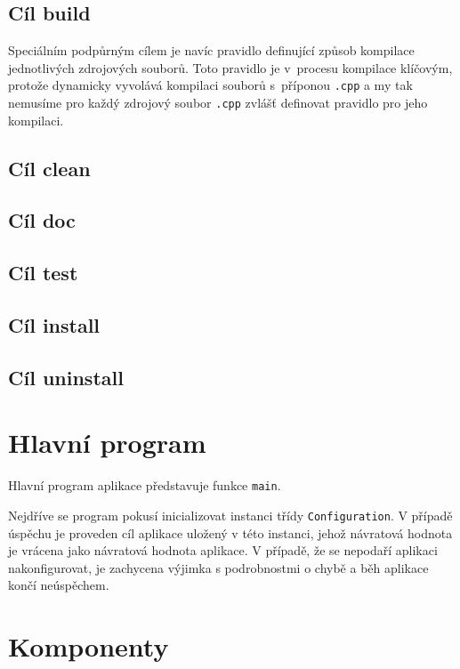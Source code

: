 \documentclass[thesis=B,czech,hidelinks]{thesis}[2012/06/26]
\begin{document}
\subsection{Cíl build}

Speciálním podpůrným cílem je navíc pravidlo definující způsob kompilace jednotlivých zdrojových souborů. Toto pravidlo je v~procesu kompilace klíčovým, protože dynamicky vyvolává kompilaci souborů s~příponou \texttt{.cpp} a my tak nemusíme pro každý zdrojový soubor \texttt{.cpp} zvlášť definovat pravidlo pro jeho kompilaci.

\subsection{Cíl clean}

\subsection{Cíl doc}

\subsection{Cíl test}

\subsection{Cíl install}

\subsection{Cíl uninstall}

\section{Hlavní program}

Hlavní program aplikace představuje funkce \texttt{main}.

Nejdříve se program pokusí inicializovat instanci třídy \texttt{Configuration}. V případě úspěchu je proveden cíl aplikace uložený v této instanci, jehož návratová hodnota je vrácena jako návratová hodnota aplikace. V případě, že se nepodaří aplikaci nakonfigurovat, je zachycena výjimka s podrobnostmi o chybě a běh aplikace končí neúspěchem.

\section{Komponenty}
\end{document}
